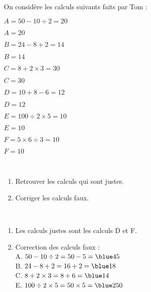 \begin{exercice} %
   On considère les calculs suivants faits par Tom :
   \setlength{\columnseprule}{0pt}
   \begin{multicols}{2}
      \begin{list}{}{}
         \item $A=50-10\div2 =20$
         \item $A=20$
         \item $B=24-8+2 =14$
         \item $B=14$
         \item $C=8+2\times3 =30$
         \item $C=30$
         \columnbreak
         \item $D=10+8-6 =12$
         \item $D=12$
         \item $E=100\div2\times5 =10$
         \item $E=10$
         \item $F=5\times6\div3 =10$
         \item $F=10$
      \end{list}
   \end{multicols}
   \  \\ [-10mm]
   \begin{enumerate}
      \item Retrouver les calculs qui sont justes.
      \item Corriger les calculs faux.
   \end{enumerate}
\end{exercice}

\begin{corrige}
   \ \\ [-5mm]
   \begin{enumerate}
      \item Les calculs justes sont les calculs {\blue D} et {\blue F}. \smallskip
      \item Correction des calculs faux : \\
         A. $50-10\div2 =50-5 ={\blue 45}$ \\ [1mm]
         B. $24-8+2 =16+2 ={\blue 18}$ \\ [1mm]
         C. $8+2\times3 =8+6 ={\blue 14}$ \\ [1mm]
         E. $100\div2\times5 =50\times5 = {\blue 250}$
   \end{enumerate}
\end{corrige}